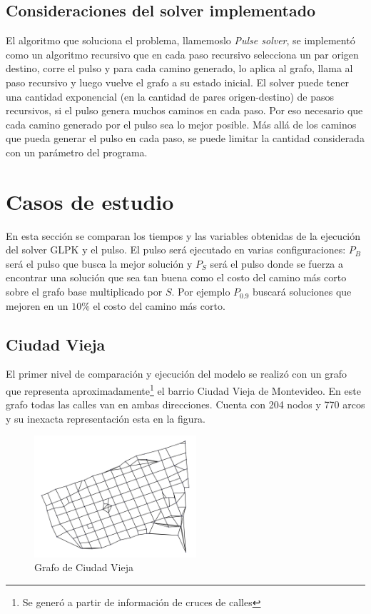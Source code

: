 \documentclass{article}
\begin{document}
  \subsection*{Consideraciones del solver implementado}

  El algoritmo que soluciona el problema, llamemoslo {\it Pulse solver}, se implementó como un algoritmo recursivo que en cada paso recursivo selecciona un par origen destino, corre el pulso y para cada camino generado, lo aplica al grafo, llama al paso recursivo y luego vuelve el grafo a su estado inicial. El solver puede tener una cantidad exponencial (en la cantidad de pares origen-destino) de pasos recursivos, si el pulso genera muchos caminos en cada paso. Por eso necesario que cada camino generado por el pulso sea lo mejor posible. Más allá de los caminos que pueda generar el pulso en cada paso, se puede limitar la cantidad considerada con un parámetro del programa.

  \section*{Casos de estudio}

  En esta sección se comparan los tiempos y las variables obtenidas de la ejecución del solver GLPK y el pulso. El pulso será ejecutado en varias configuraciones: $P_B$ será el pulso que busca la mejor solución y $P_S$ será el pulso donde se fuerza a encontrar una solución que sea tan buena como el costo del camino más corto sobre el grafo base multiplicado por $S$. Por ejemplo $P_{0.9}$ buscará soluciones que mejoren en un $10\%$ el costo del camino más corto.

  \subsection*{Ciudad Vieja}

  El primer nivel de comparación y ejecución del modelo se realizó con un grafo que representa aproximadamente\footnote{Se generó a partir de información de cruces de calles} el barrio Ciudad Vieja de Montevideo. En este grafo todas las calles van en ambas direcciones. Cuenta con 204 nodos y 770 arcos y su inexacta representación esta en la figura.

  \begin{figure}[]
    \centering
    \includegraphics[width=6cm]{imgs/mdeo_med.png}
    \caption{Grafo de Ciudad Vieja}
    \label{ciudadvieja}
  \end{figure}
\end{document}

